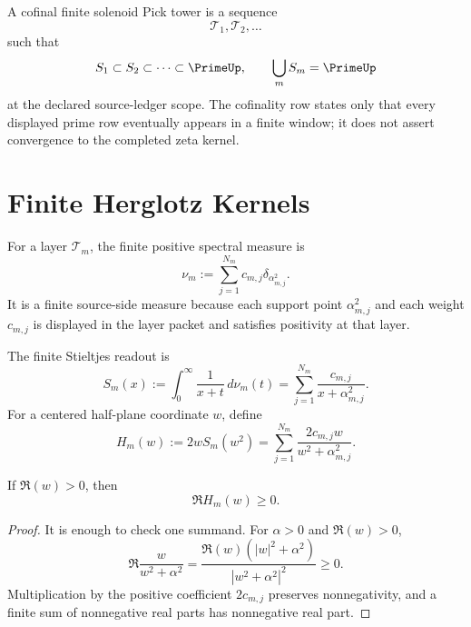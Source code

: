 \begin{definition}
\label{def:rh-cofinal-finite-solenoid-pick-tower}
A cofinal finite solenoid Pick tower is a sequence
$$
\mathcal T_1,\mathcal T_2,\ldots
$$
such that
$$
S_1\subset S_2\subset\cdots\subset\PrimeUp,
\qquad
\bigcup_m S_m=\PrimeUp
$$
at the declared source-ledger scope. The cofinality row states only that
every displayed prime row eventually appears in a finite window; it does
not assert convergence to the completed zeta kernel.
\end{definition}

\section{Finite Herglotz Kernels}
\label{sec:rh-triadic-solenoid-finite-herglotz}

\begin{definition}
\label{def:rh-finite-positive-spectral-measure}
For a layer $\mathcal T_m$, the finite positive spectral measure is
$$
\nu_m
:=
\sum_{j=1}^{N_m}c_{m,j}\delta_{\alpha_{m,j}^2}.
$$
It is a finite source-side measure because each support point
$\alpha_{m,j}^2$ and each weight $c_{m,j}$ is displayed in the layer
packet and satisfies positivity at that layer.
\end{definition}

\begin{definition}
\label{def:rh-finite-stieltjes-herglotz-readouts}
The finite Stieltjes readout is
$$
S_m(x)
:=
\int_0^\infty\frac{1}{x+t}\,d\nu_m(t)
=
\sum_{j=1}^{N_m}
\frac{c_{m,j}}{x+\alpha_{m,j}^2}.
$$
For a centered half-plane coordinate $w$, define
$$
H_m(w)
:=
2wS_m(w^2)
=
\sum_{j=1}^{N_m}
\frac{2c_{m,j}w}{w^2+\alpha_{m,j}^2}.
$$
\end{definition}

\begin{theorem}
\label{thm:rh-finite-layer-herglotz}
If $\Re(w)>0$, then
$$
\Re H_m(w)\ge0.
$$
\end{theorem}

\begin{proof}
It is enough to check one summand. For $\alpha>0$ and $\Re(w)>0$,
$$
\Re\frac{w}{w^2+\alpha^2}
=
\frac{\Re(w)(|w|^2+\alpha^2)}
{|w^2+\alpha^2|^2}
\ge0.
$$
Multiplication by the positive coefficient $2c_{m,j}$ preserves
nonnegativity, and a finite sum of nonnegative real parts has nonnegative
real part.
\end{proof}

